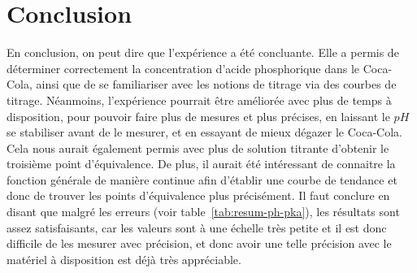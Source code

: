 \documentclass[11pt]{article}
\begin{document}
\section{Conclusion}\label{sec:conclusion}
En conclusion, on peut dire que l'expérience a été concluante.
Elle a permis de déterminer correctement la concentration d'acide phosphorique dans le Coca-Cola, ainsi que de se
familiariser avec les notions de titrage via des courbes de titrage.
Néanmoins, l'expérience pourrait être améliorée avec plus de temps à disposition, pour pouvoir faire plus de mesures
et plus précises, en laissant le $pH$ se stabiliser avant de le mesurer, et en essayant de mieux dégazer le Coca-Cola.
Cela nous aurait également permis avec plus de solution titrante d'obtenir le troisième point d'équivalence.
De plus, il aurait été intéressant de connaitre la fonction générale de manière continue afin d'établir une courbe de
tendance et donc de trouver les points d'équivalence plus précisément.
Il faut conclure en disant que malgré les erreurs (voir table~\ref{tab:resum-ph-pka}), les résultats sont assez
satisfaisants, car les valeurs sont à une échelle très petite et il est donc difficile de les mesurer avec précision,
et donc avoir une telle précision avec le matériel à disposition est déjà très appréciable.
\end{document}
